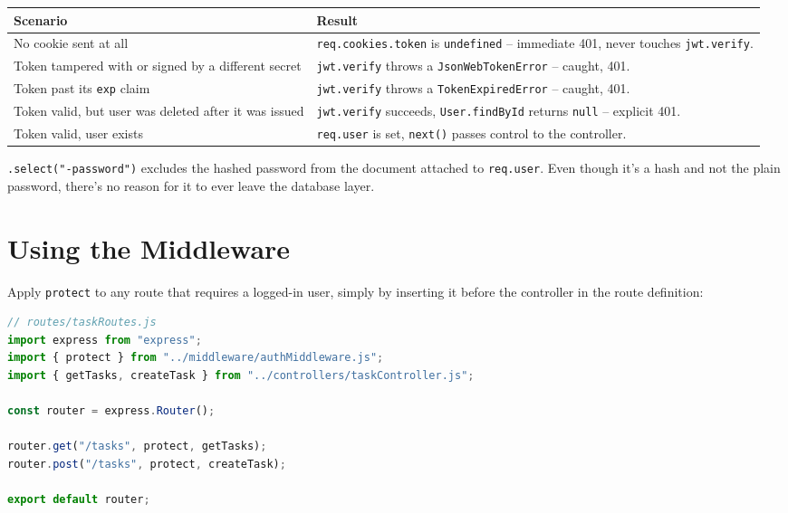 \begin{center}
\begin{tabularx}{\textwidth}{lX}
\toprule
\textbf{Scenario} & \textbf{Result} \\
\midrule
No cookie sent at all & \texttt{req.cookies.token} is \texttt{undefined} -- immediate 401, never touches \texttt{jwt.verify}. \\
Token tampered with or signed by a different secret & \texttt{jwt.verify} throws a \texttt{JsonWebTokenError} -- caught, 401. \\
Token past its \texttt{exp} claim & \texttt{jwt.verify} throws a \texttt{TokenExpiredError} -- caught, 401. \\
Token valid, but user was deleted after it was issued & \texttt{jwt.verify} succeeds, \texttt{User.findById} returns \texttt{null} -- explicit 401. \\
Token valid, user exists & \texttt{req.user} is set, \texttt{next()} passes control to the controller. \\
\bottomrule
\end{tabularx}
\end{center}

\begin{notebox}[NOTE]
\texttt{.select("-password")} excludes the hashed password from the document
attached to \texttt{req.user}. Even though it's a hash and not the plain
password, there's no reason for it to ever leave the database layer.
\end{notebox}

\section{Using the Middleware}

Apply \texttt{protect} to any route that requires a logged-in user, simply
by inserting it before the controller in the route definition:

\begin{lstlisting}[language=JavaScript]
// routes/taskRoutes.js
import express from "express";
import { protect } from "../middleware/authMiddleware.js";
import { getTasks, createTask } from "../controllers/taskController.js";

const router = express.Router();

router.get("/tasks", protect, getTasks);
router.post("/tasks", protect, createTask);

export default router;
\end{lstlisting}


